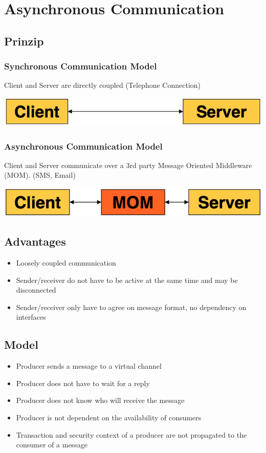 \documentclass[10pt]{article}
\begin{document}
\newpage
\section{Asynchronous Communication}
\subsection{Prinzip}
\subsubsection{Synchronous Communication Model}
Client and Server are directly coupled (Telephone Connection)
\begin{center}
	\includegraphics[scale=0.25]{communication-synchron.png}
\end{center}
\subsubsection{Asynchronous Communication Model}
 Client and Server communicate over a 3rd party Message Oriented Middleware (MOM). (SMS, Email)
 \begin{center}
	\includegraphics[scale=0.25]{communication-asynchron.png}
\end{center}
\subsection{Advantages}
\begin{itemize}
	\item Loosely coupled communication
	\item Sender/receiver do not have to be active at the same time and may be disconnected
	\item Sender/receiver only have to agree on message format, no dependency on interfaces
\end{itemize}
\subsection{Model}
\begin{itemize}
	\item Producer sends a message to a virtual channel
	\item Producer does not have to wait for a reply
	\item Producer does not know who will receive the message
	\item Producer is not dependent on the availability of consumers
	\item Transaction and security context of a producer are not propagated to the consumer of a message
\end{itemize}
\end{document}
